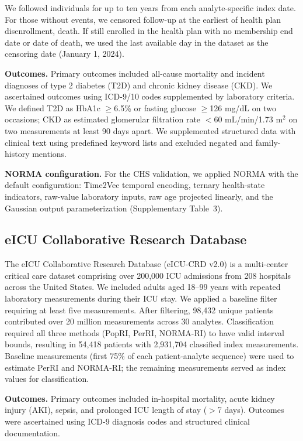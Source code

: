 \documentclass[11pt]{article}
\begin{document}
We followed individuals for up to ten years from each analyte-specific index date. For those without events, we censored follow-up at the earliest of health plan disenrollment, death. If still enrolled in the health plan with no membership end date or date of death, we used the last available day in the dataset as the censoring date (January 1, 2024).

\textbf{Outcomes.} Primary outcomes included all-cause mortality and incident diagnoses of type 2 diabetes (T2D) and chronic kidney disease (CKD). We ascertained outcomes using ICD-9/10 codes supplemented by laboratory criteria. We defined T2D as HbA1c $\geq$6.5\% or fasting glucose $\geq$126 mg/dL on two occasions; CKD as estimated glomerular filtration rate $<$60 mL/min/1.73 m$^2$ on two measurements at least 90 days apart. We supplemented structured data with clinical text using predefined keyword lists and excluded negated and family-history mentions.

\textbf{NORMA configuration.} For the CHS validation, we applied NORMA with the default configuration: Time2Vec temporal encoding, ternary health-state indicators, raw-value laboratory inputs, raw age projected linearly, and the Gaussian output parameterization (Supplementary Table~3).

\subsection*{eICU Collaborative Research Database}

The eICU Collaborative Research Database (eICU-CRD v2.0) is a multi-center critical care dataset comprising over 200,000 ICU admissions from 208 hospitals across the United States. We included adults aged 18--99 years with repeated laboratory measurements during their ICU stay. We applied a baseline filter requiring at least five measurements. After filtering, 98,432 unique patients contributed over 20 million measurements across 30 analytes. Classification required all three methods (PopRI, PerRI, NORMA-RI) to have valid interval bounds, resulting in 54,418 patients with 2,931,704 classified index measurements. Baseline measurements (first 75\% of each patient-analyte sequence) were used to estimate PerRI and NORMA-RI; the remaining measurements served as index values for classification.

\textbf{Outcomes.} Primary outcomes included in-hospital mortality, acute kidney injury (AKI), sepsis, and prolonged ICU length of stay ($>$7 days). Outcomes were ascertained using ICD-9 diagnosis codes and structured clinical documentation.
\end{document}
